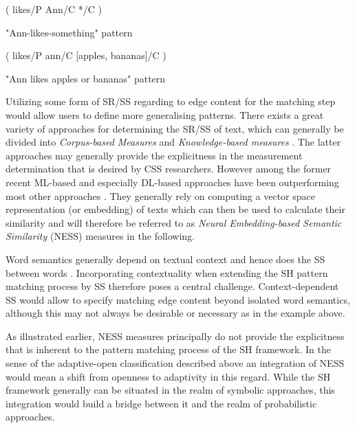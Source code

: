 \documentclass[11pt]{scrreprt}
\let\cite\parencite  %
\begin{document}
\begin{pattern}[h!]
  \normalfont\sffamily
  \centering
  ( likes/P Ann/C */C )
  \caption{"Ann-likes-something" pattern}
  \label{pat:ann-likes-something}
\end{pattern}

\begin{pattern}[h!]
  \normalfont\sffamily
  \centering
  ( likes/P ann/C [apples, bananas]/C )
  \caption{"Ann likes apples or bananas" pattern}
  \label{pat:ann-likes-apples-and-bananas}
\end{pattern}

Utilizing some form of SR/SS regarding to edge content for the matching step would allow users to define more generalising patterns. There exists a great variety of approaches for determining the SR/SS of text, which can generally be divided into \textit{Corpus-based Measures} and \textit{Knowledge-based measures} \cite[Section~1.3.2]{harispeSemanticSimilarityNatural2015}. The latter approaches may generally provide the explicitness in the measurement determination that is desired by CSS researchers. However among the former recent ML-based and especially DL-based approaches have been outperforming most other approaches \cite{chandrasekaranEvolutionSemanticSimilarity2021}. They generally rely on computing a vector space representation (or embedding) of texts which can then be used to calculate their similarity and will therefore be referred to as \textit{Neural Embedding-based Semantic Similarity} (NESS) measures in the following. 

Word semantics generally depend on textual context and hence does the SS between words \cite[Section~2.2.3]{harispeSemanticSimilarityNatural2015}. Incorporating contextuality when extending the SH pattern matching process by SS therefore poses a central challenge. Context-dependent SS would allow to specify matching edge content beyond isolated word semantics, although this may not always be desirable or necessary as in the example above. 

As illustrated earlier, NESS measures principally do not provide the explicitness that is inherent to the pattern matching process of the SH framework. In the sense of the adaptive-open classification described above an integration of NESS would mean a shift from openness to adaptivity in this regard. While the SH framework generally can be situated in the realm of symbolic approaches, this integration would build a bridge between it and the realm of probabilistic approaches.
\end{document}
